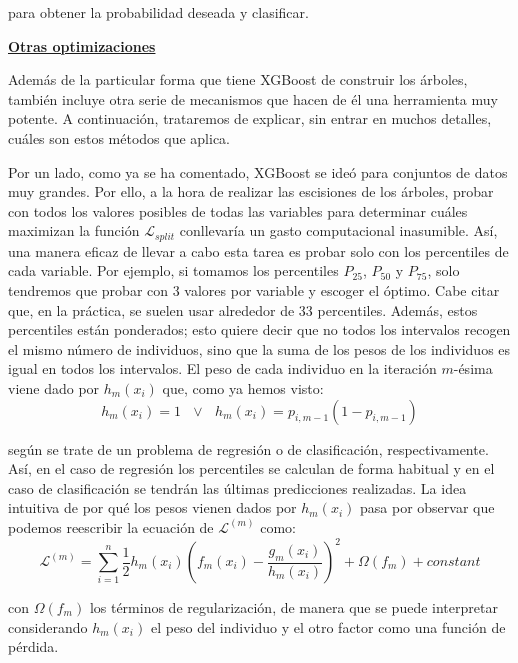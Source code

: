 \documentclass[12pt,twoside]{article}
\begin{document}
\noindent
para obtener la probabilidad deseada y clasificar.



\newpage

\textbf{\underline{Otras optimizaciones}}

Además de la particular forma que tiene XGBoost de construir los árboles, también incluye otra serie de mecanismos que hacen de él una herramienta muy potente. A continuación, trataremos de explicar, sin entrar en muchos detalles, cuáles son estos métodos que aplica.

Por un lado, como ya se ha comentado, XGBoost se ideó para conjuntos de datos muy grandes. Por ello, a la hora de realizar las escisiones de los árboles, probar con todos los valores posibles de todas las variables para determinar cuáles maximizan la función $\mathcal{L}_{split}$ conllevaría un gasto computacional inasumible. Así, una manera eficaz de llevar a cabo esta tarea es probar solo con los percentiles de cada variable. Por ejemplo, si tomamos los percentiles $P_{25}$, $P_{50}$ y $P_{75}$, solo tendremos que probar con 3 valores por variable y escoger el óptimo. Cabe citar que, en la práctica, se suelen usar alrededor de 33 percentiles. Además, estos percentiles están ponderados; esto quiere decir que no todos los intervalos recogen el mismo número de individuos, sino que la suma de los pesos de los individuos es igual en todos los intervalos. El peso de cada individuo en la iteración $m$-ésima viene dado por $h_m(x_i)$ que, como ya hemos visto:
\begin{equation*}
h_m(x_i) = 1 \, \, \, \, \vee \, \, \, \, h_m(x_i) = p_{i, m-1}(1 - p_{i, m-1})
\end{equation*}

\noindent
según se trate de un problema de regresión o de clasificación, respectivamente. Así, en el caso de regresión los percentiles se calculan de forma habitual y en el caso de clasificación se tendrán las últimas predicciones realizadas. La idea intuitiva de por qué los pesos vienen dados por $h_m(x_i)$ pasa por observar que podemos reescribir la ecuación de $\mathcal{L}^{(m)}$ como:
\begin{equation*}
\mathcal{L}^{(m)} = \sum_{i = 1}^n \frac{1}{2} h_m(x_i) \left( f_m(x_i) - \frac{g_m(x_i)}{h_m(x_i)} \right)^2 + \Omega(f_m) + constant
\end{equation*}

\noindent
con $\Omega(f_m)$ los términos de regularización, de manera que se puede interpretar considerando $h_m(x_i)$ el peso del individuo y el otro factor como una función de pérdida.
\end{document}
